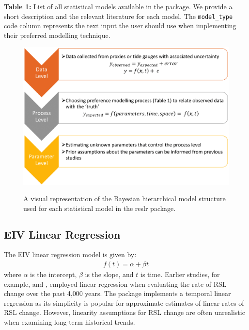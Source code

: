\textbf{Table 1:} List of all statistical models available in the  package. We provide a short description and the relevant literature for each model. The \texttt{model\_type} code column represents the text input the user should use when implementing their preferred modelling technique.
\begin{figure}
{\centering \includegraphics[width=0.5\linewidth]{figures/hierarchical_model_def} 
}
\caption{A visual representation of the Bayesian hierarchical model structure used for each statistical model in the reslr package.}\label{fig:dag}
\end{figure}
\subsection{EIV Linear Regression}\label{linearregression}
The EIV linear regression model is given by:
\begin{align}
f(t) = \alpha + \beta t
\end{align}
where \(\alpha\) is the intercept, \(\beta\) is the slope, and \(t\) is time. Earlier studies, for example, \citet{Shennan2002} and \citet{Engelhart2009}, employed linear regression when evaluating the rate of RSL change over the past 4,000 years. The  package implements a temporal linear regression as its simplicity is popular for approximate estimates of linear rates of RSL change. However, linearity assumptions for RSL change are often unrealistic when examining long-term historical trends.
